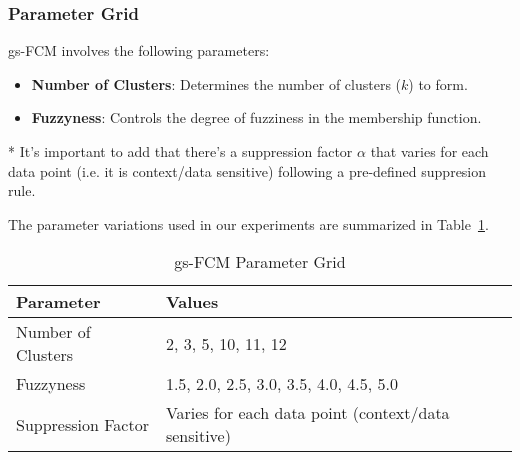 \subsubsection{Parameter Grid}
gs-FCM involves the following parameters:

\begin{itemize}
    \item \textbf{Number of Clusters}: Determines the number of clusters (\(k\)) to form.
    \item \textbf{Fuzzyness}: Controls the degree of fuzziness in the membership function.
\end{itemize}

* It's important to add that there's a suppression factor $\alpha$ that varies for each data point
(i.e. it is context/data sensitive) following a pre-defined suppresion rule.

The parameter variations used in our experiments are summarized in Table~\ref{tab:gsfcm-param-grid}.

\begin{table}[h!]
\centering
\caption{gs-FCM Parameter Grid}
\label{tab:gsfcm-param-grid}
\begin{tabularx}{\columnwidth}{|X|X|}
\hline
\textbf{Parameter} & \textbf{Values} \\ \hline
Number of Clusters & 2, 3, 5, 10, 11, 12 \\ \hline
Fuzzyness & 1.5, 2.0, 2.5, 3.0, 3.5, 4.0, 4.5, 5.0 \\ \hline
Suppression Factor & Varies for each data point (context/data sensitive) \\ \hline
\end{tabularx}
\end{table}
